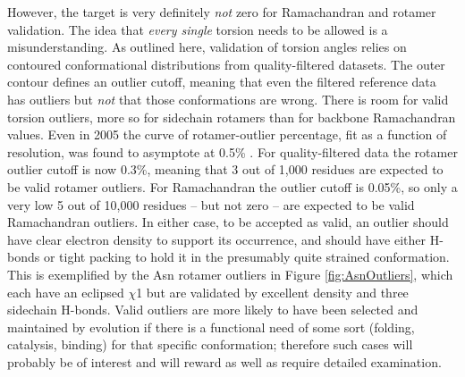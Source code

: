 However, the target is very definitely \textit{not} zero for \textcolor{changecolor}{Ramachandran and rotamer validation. The idea that \textit{every single} torsion} needs to be allowed is a misunderstanding. As outlined here, validation of torsion angles relies on contoured conformational distributions from quality-filtered datasets. The outer contour defines an outlier cutoff, meaning that even the filtered reference data has outliers but \textit{not} that those conformations are wrong. There is room for valid torsion outliers, more so for sidechain rotamers than for backbone Ramachandran values. Even in 2005 the curve of rotamer-outlier percentage, fit as a function of resolution, was found to asymptote at 0.5\% \cite{Arendall2005}. For quality-filtered data the rotamer outlier cutoff is now 0.3\%, meaning that 3 out of 1,000 residues are expected to be valid rotamer outliers. For Ramachandran the outlier cutoff is 0.05\%, so only a very low 5 out of 10,000 residues -- but not zero -- are expected to be valid Ramachandran outliers. In either case, to be accepted as valid, an outlier should have clear electron density to support its occurrence, and should have either H-bonds or tight packing to hold it in the presumably quite strained conformation. This is exemplified by the Asn rotamer outliers in Figure \ref{fig:AsnOutliers}, which each have an eclipsed $\chi$1 but are validated by excellent density and three sidechain H-bonds.  Valid outliers are more likely to have been selected and maintained by evolution if there is a functional need of some sort (folding, catalysis, binding) for that specific conformation; therefore such cases will probably be of interest and will reward as well as require detailed examination.

